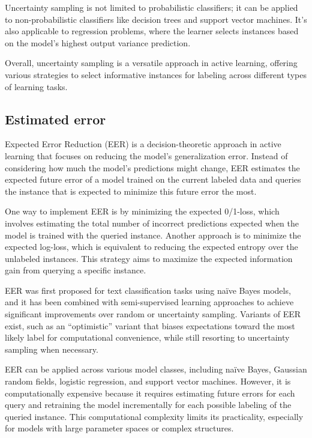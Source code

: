 \documentclass[11pt]{article}
\begin{document}
Uncertainty sampling is not limited to probabilistic classifiers; it can be applied to non-probabilistic classifiers like decision trees and support vector machines. It's also applicable to regression problems, where the learner selects instances based on the model's highest output variance prediction.

Overall, uncertainty sampling is a versatile approach in active learning, offering various strategies to select informative instances for labeling across different types of learning tasks.

\subsection{Estimated error}
Expected Error Reduction (EER) is a decision-theoretic approach in active learning that focuses on reducing the model's generalization error. Instead of considering how much the model's predictions might change, EER estimates the expected future error of a model trained on the current labeled data and queries the instance that is expected to minimize this future error the most.

One way to implement EER is by minimizing the expected 0/1-loss, which involves estimating the total number of incorrect predictions expected when the model is trained with the queried instance. Another approach is to minimize the expected log-loss, which is equivalent to reducing the expected entropy over the unlabeled instances. This strategy aims to maximize the expected information gain from querying a specific instance\cite{zhao_efficient_2021}.

EER was first proposed for text classification tasks using naïve Bayes models, and it has been combined with semi-supervised learning approaches to achieve significant improvements over random or uncertainty sampling. Variants of EER exist, such as an ``optimistic'' variant that biases expectations toward the most likely label for computational convenience, while still resorting to uncertainty sampling when necessary.

EER can be applied across various model classes, including naïve Bayes, Gaussian random fields, logistic regression, and support vector machines. However, it is computationally expensive because it requires estimating future errors for each query and retraining the model incrementally for each possible labeling of the queried instance. This computational complexity limits its practicality, especially for models with large parameter spaces or complex structures.
\end{document}
